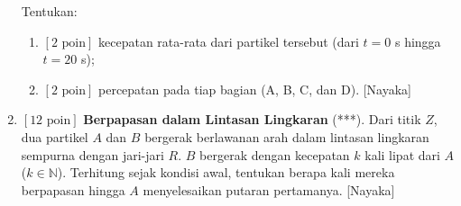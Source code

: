 \documentclass[12pt, a4paper]{article}\usepackage[utf8]{inputenc}
\theoremstyle{definition}
\theoremstyle{definition}
\begin{document}
\begin{enumerate}
\begin{center}
\begin{tikzpicture}[x=0.75pt,y=0.75pt,yscale=-1,xscale=1]
					
				\end{tikzpicture}
			\end{center}
			
			Tentukan:
			\begin{enumerate}[label=(\alph*)]
				\item $\left[\text{2 poin}\right]$ kecepatan rata-rata dari partikel tersebut (dari $t = 0$ s hingga $t = 20$ s);
				\item $\left[\text{2 poin}\right]$ percepatan pada tiap bagian (A, B, C, dan D). [Nayaka]
			\end{enumerate} 
			
			\item  $\left[ \text{12 poin} \right]$ \textbf{Berpapasan dalam Lintasan Lingkaran} (***). Dari titik $Z$, dua partikel $A$ dan $B$ bergerak berlawanan arah dalam lintasan lingkaran sempurna dengan jari-jari $R$. $B$ bergerak dengan kecepatan $k$ kali lipat dari $A$ ($k \in \mathbb{N}$). Terhitung sejak kondisi awal, tentukan berapa kali mereka berpapasan hingga $A$ menyelesaikan putaran pertamanya. [Nayaka]
			
			\begin{center}
				
				
				
				\begin{tikzpicture}[x=0.75pt,y=0.75pt,yscale=-1,xscale=1]
					

\end{tikzpicture}
\end{center}
\end{enumerate}
\end{document}

